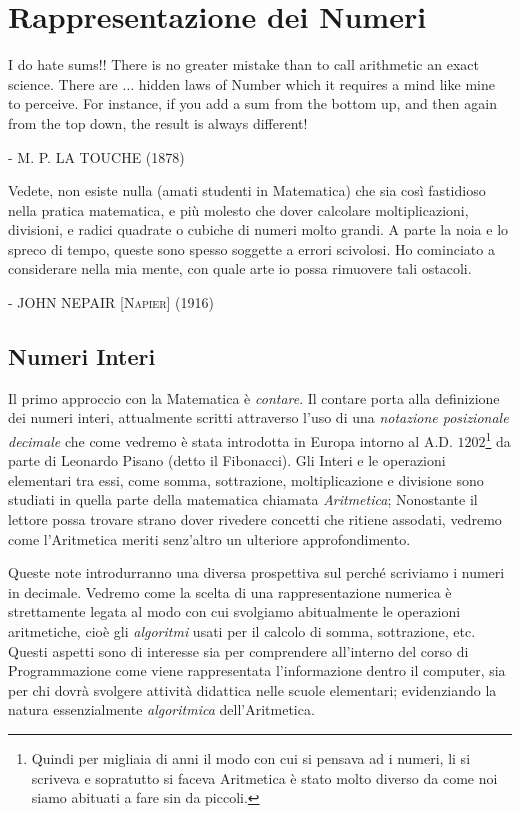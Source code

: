 
\chapter{Rappresentazione dei Numeri}

\epigraph{I do hate sums!! There is no greater mistake than to call arithmetic
an exact science. There are $\ldots$ hidden laws of Number which it requires a
mind like mine to perceive. For instance, if you add a sum from the bottom up,
and then again from the top down, the result is always different!}{ -
\textsc{M. P. LA TOUCHE} (1878)} 

\epigraph{Vedete, non esiste nulla (amati studenti in Matematica) che sia così
fastidioso nella pratica matematica, e più molesto che dover calcolare
moltiplicazioni, divisioni, e radici quadrate o cubiche di numeri molto grandi.
A parte la noia e lo spreco di tempo, queste sono spesso soggette a errori
scivolosi. Ho cominciato a considerare nella mia mente, con quale arte io possa
rimuovere tali ostacoli.} { - \textsc{JOHN NEPAIR [Napier] (1916)}}

\section[Numeri Interi]{Numeri Interi}

Il primo approccio con la Matematica è \emph{contare}. Il contare porta alla
definizione dei numeri interi, attualmente scritti attraverso l'uso di una
\emph{notazione posizionale decimale} che come vedremo è stata introdotta in
Europa intorno al A.D. $1202$\footnote{Quindi per migliaia di anni il modo con
cui si pensava ad i numeri, li si scriveva e sopratutto si faceva Aritmetica è
stato molto diverso da come noi siamo abituati a fare sin da piccoli.} da parte
di Leonardo Pisano (detto il Fibonacci). Gli Interi e le operazioni elementari
tra essi, come somma, sottrazione, moltiplicazione e divisione sono studiati in
quella parte della matematica chiamata \emph{Aritmetica}; Nonostante il lettore
possa trovare strano dover rivedere concetti che ritiene assodati, vedremo come l'Aritmetica meriti senz'altro un ulteriore approfondimento.

Queste note introdurranno una diversa prospettiva sul perché scriviamo i numeri in decimale. Vedremo come la scelta di una rappresentazione numerica è strettamente legata al modo con cui svolgiamo abitualmente le operazioni aritmetiche, cioè
gli \emph{algoritmi} usati per il calcolo di somma, sottrazione, etc. 
Questi aspetti sono di interesse sia per comprendere all'interno del corso di Programmazione come viene rappresentata l'informazione dentro il computer, sia per chi dovrà svolgere attività didattica nelle scuole
elementari; evidenziando la natura essenzialmente \emph{algoritmica}
dell'Aritmetica.

